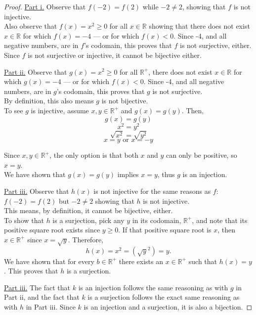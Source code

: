 \documentclass{amsart}
\theoremstyle{definition}
\theoremstyle{definition}
\theoremstyle{remark}
\begin{document}
\bigskip
\begin{proof}
      \underline{Part i.} \quad Observe that $f(-2) = f(2)$ while $-2 \neq 2$, showing that $f$ is not injective. \\
      Also observe that $f(x)=x^2 \geq 0$ for all $x \in \mathbb{R}$ showing that there does not exist $x \in \mathbb{R}$ for which $f(x) = -4$ --- or for which $f(x)  < 0$. Since -4, and all negative numbers, are in $f$'s codomain, this proves that $f$ is not surjective, either. \\
      Since $f$ is not surjective or injective, it cannot be bijective either.


      \medskip
      \underline{Part ii.} \quad Observe that $g(x)=x^2 \geq 0$ for all $\mathbb{R^+}$, there does not exist $x \in\mathbb{R}$ for which $g(x) = -4$ --- or for which $f(x)  < 0$. Since -4, and all negative numbers, are in $g$'s codomain, this proves that $g$ is not surjective. \\
      By definition, this also means $g$ is not bijective. \\
      To see $g$ is injective, assume $x,y\in \mathbb{R^+}$ and $g(x)=g(y)$. Then,
      \[ g(x) = g(y) \]
      \[ x^2 = y^2 \]
      \[ \sqrt{x^2} = \sqrt{y^2} \]
      \[x = y \text{ or } x=-y\]

      Since $x,y\in\mathbb{R^+}$, the only option is that both $x$ and $y$ can only be positive, so $x=y$. \\
      We have shown that $g(x)=g(y)$ implies $x=y$, thus $g$ is an injection.


      \medskip
      \underline{Part iii.} \quad Observe that $h(x)$ is not injective for the same reasons as $f$: $f(-2)=f(2)$ but $-2 \neq 2$ showing that $h$ is not injective. \\
      This means, by definition, it cannot be bijective, either. \\
      To show that $h$ is a surjection, pick any $y$ in its codomain, $\mathbb{R^+}$, and note that its positive square root exists since $y \geq 0$. If that positive square root is $x$, then $x\in\mathbb{R^+}$ since $x=\sqrt{y}$. Therefore,
      \[h(x) = x^2 = (\sqrt{y}^2) = y. \]
      We have shown that for every $b\in\mathbb{R^+}$ there exists an $x\in\mathbb{R^+}$ such that $h(x)=y$. This proves that $h$ is a surjection.


      \medskip
      \underline{Part iii.} \quad The fact that $k$ is an injection follows the same reasoning as with $g$ in Part ii, and the fact that $k$ is a surjection follows the exact same reasoning as with $h$ in Part iii. Since $k$ is an injection and a surjection, it is also a bijection.

\end{proof}
\end{document}
